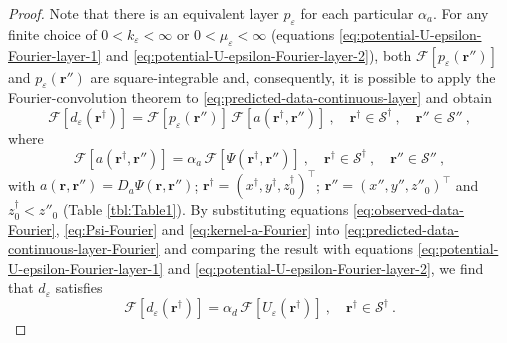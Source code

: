 \begin{proof}
	Note that there is an equivalent layer $p_{\varepsilon}$ for each particular $\alpha_{a}$.
	For any finite choice of $0 < k_{\varepsilon} < \infty$ or $0 < \mu_{\varepsilon} < \infty$
	(equations \ref{eq:potential-U-epsilon-Fourier-layer-1} and \ref{eq:potential-U-epsilon-Fourier-layer-2}), 
	both $\mathcal{F} [ p_{\varepsilon}(\mathbf{r}'') ]$ 
	and $p_{\varepsilon}(\mathbf{r}'')$ are square-integrable and, consequently, it is possible to
	apply the Fourier-convolution theorem to \ref{eq:predicted-data-continuous-layer} and obtain
	\begin{equation}
		\mathcal{F} [ d_{\varepsilon}(\mathbf{r}^{\dagger}) ] =
		\mathcal{F} [ p_{\varepsilon}(\mathbf{r}'') ] \, 
		\mathcal{F} [ a(\mathbf{r}^{\dagger}, \mathbf{r}'') ] \: ,
		\quad \mathbf{r}^{\dagger} \in \mathcal{S}^{\dagger} \: ,
		\quad \mathbf{r}'' \in \mathcal{S}'' \: ,
		\label{eq:predicted-data-continuous-layer-Fourier}
	\end{equation}
	where 
	\begin{equation}
		\mathcal{F} [ a(\mathbf{r}^{\dagger}, \mathbf{r}'') ] = \alpha_{a} \, \mathcal{F} [ \Psi(\mathbf{r}^{\dagger}, \mathbf{r}'') ] \: ,
		\quad \mathbf{r}^{\dagger} \in \mathcal{S}^{\dagger} \: ,
		\quad \mathbf{r}'' \in \mathcal{S}'' \: ,
		\label{eq:kernel-a-Fourier}
	\end{equation}
	with $a(\mathbf{r}, \mathbf{r}'') = D_{a} \Psi(\mathbf{r}, \mathbf{r}'')$;
	$\mathbf{r}^{\dagger} = (x^{\dagger}, y^{\dagger}, z^{\dagger}_{0})^{\top}$; 
	$\mathbf{r}'' = (x'', y'', z''_{0})^{\top}$ and $z^{\dagger}_{0} < z''_{0}$ (Table \ref{tbl:Table1}).
	By substituting equations \ref{eq:observed-data-Fourier}, \ref{eq:Psi-Fourier} and \ref{eq:kernel-a-Fourier} 
	into \ref{eq:predicted-data-continuous-layer-Fourier} and comparing the result with equations 
	\ref{eq:potential-U-epsilon-Fourier-layer-1} and \ref{eq:potential-U-epsilon-Fourier-layer-2}, 
	we find that $d_{\varepsilon}$ satisfies
	\begin{equation}
		\mathcal{F} [ d_{\varepsilon}(\mathbf{r}^{\dagger}) ] = 
		\alpha_{d} \,
		\mathcal{F} [ U_{\varepsilon}(\mathbf{r}^{\dagger}) ] \: ,
		\quad \mathbf{r}^{\dagger} \in \mathcal{S}^{\dagger} \: .
		\label{eq:predicted-data-continuous-layer-epsilon-Fourier}
	\end{equation}


\end{proof}

